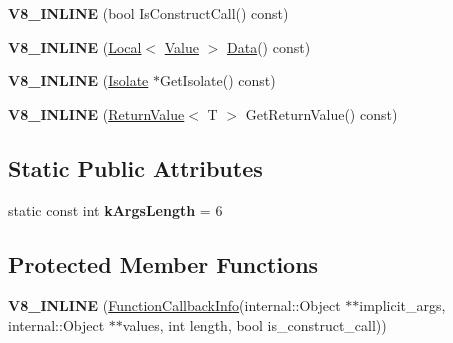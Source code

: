 \begin{DoxyCompactItemize}
\item 
\hypertarget{classv8_1_1_function_callback_info_ab846a942ccafa63fda701bd210227247}{}{\bfseries V8\+\_\+\+I\+N\+L\+I\+N\+E} (bool Is\+Construct\+Call() const)\label{classv8_1_1_function_callback_info_ab846a942ccafa63fda701bd210227247}

\item 
\hypertarget{classv8_1_1_function_callback_info_ab8213a5ceecedeff03aa9730318c636e}{}{\bfseries V8\+\_\+\+I\+N\+L\+I\+N\+E} (\hyperlink{classv8_1_1_local}{Local}$<$ \hyperlink{classv8_1_1_value}{Value} $>$ \hyperlink{classv8_1_1_data}{Data}() const)\label{classv8_1_1_function_callback_info_ab8213a5ceecedeff03aa9730318c636e}

\item 
\hypertarget{classv8_1_1_function_callback_info_a2304cc5a903152c487f5ed279920292f}{}{\bfseries V8\+\_\+\+I\+N\+L\+I\+N\+E} (\hyperlink{classv8_1_1_isolate}{Isolate} $\ast$Get\+Isolate() const)\label{classv8_1_1_function_callback_info_a2304cc5a903152c487f5ed279920292f}

\item 
\hypertarget{classv8_1_1_function_callback_info_a8c339f0ae3cc6d227164b3fe66d079b7}{}{\bfseries V8\+\_\+\+I\+N\+L\+I\+N\+E} (\hyperlink{classv8_1_1_return_value}{Return\+Value}$<$ T $>$ Get\+Return\+Value() const)\label{classv8_1_1_function_callback_info_a8c339f0ae3cc6d227164b3fe66d079b7}

\end{DoxyCompactItemize}
\subsection*{Static Public Attributes}
\begin{DoxyCompactItemize}
\item 
\hypertarget{classv8_1_1_function_callback_info_a1e5248c2d40840270829882feaaa9d34}{}static const int {\bfseries k\+Args\+Length} = 6\label{classv8_1_1_function_callback_info_a1e5248c2d40840270829882feaaa9d34}

\end{DoxyCompactItemize}
\subsection*{Protected Member Functions}
\begin{DoxyCompactItemize}
\item 
\hypertarget{classv8_1_1_function_callback_info_a25d035ab7e81462aac03996a2942efa1}{}{\bfseries V8\+\_\+\+I\+N\+L\+I\+N\+E} (\hyperlink{classv8_1_1_function_callback_info}{Function\+Callback\+Info}(internal\+::\+Object $\ast$$\ast$implicit\+\_\+args, internal\+::\+Object $\ast$$\ast$values, int length, bool is\+\_\+construct\+\_\+call))\label{classv8_1_1_function_callback_info_a25d035ab7e81462aac03996a2942efa1}

\end{DoxyCompactItemize}
